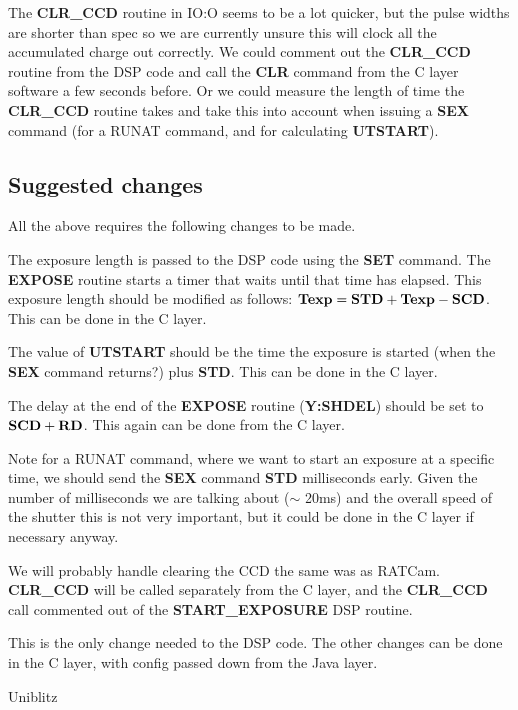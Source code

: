 \documentclass[10pt,a4paper]{article}
\begin{document}
The {\bf CLR\_CCD} routine in IO:O seems to be a lot quicker, but the pulse widths are shorter than spec so we 
are currently unsure this will clock all the accumulated charge out correctly. We could comment out the 
{\bf CLR\_CCD} routine from the DSP code and call the {\bf CLR} command from the C layer software a few seconds before.
Or we could measure the length of time the {\bf CLR\_CCD} routine takes and take this into account when issuing
a {\bf SEX} command (for a RUNAT command, and for calculating {\bf UTSTART}).


\subsection{Suggested changes}

All the above requires the following changes to be made.

The exposure length is passed to the DSP code using the {\bf SET} command. The {\bf EXPOSE} routine starts a timer
that waits until that time has elapsed. This exposure length should be modified as follows:
${\bf Texp} = {\bf STD} + {\bf Texp} - {\bf SCD}$. This can be done in the C layer.

The value of {\bf UTSTART} should be the time the exposure is started (when the {\bf SEX} command returns?)
 plus {\bf STD}. This can be done in the C layer.

The delay at the end of the {\bf EXPOSE} routine ({\bf Y:SHDEL}) should be set to ${\bf SCD} + {\bf RD}$.
This again can be done from the C layer.

Note for a RUNAT command, where we want to start an exposure at a specific time, we should send the
{\bf SEX} command {\bf STD} milliseconds early. Given the number of milliseconds we are talking about ($\sim$ 20ms)
and the overall speed of the shutter this is not very important, but it could be done in the C layer if necessary anyway.

We will probably handle clearing the CCD the same was as RATCam. {\bf CLR\_CCD} will be called separately from the 
C layer, and the {\bf CLR\_CCD} call commented out of the {\bf START\_EXPOSURE} DSP routine. 

This is the only change needed to the DSP code. The other changes can be done in the C layer, with
config passed down from the Java layer.

\begin{thebibliography}{99}

Uniblitz 

\end{thebibliography}
\end{document}
